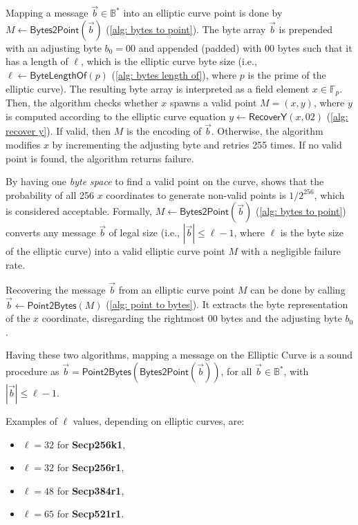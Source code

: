 Mapping a message $\vec{b} \in \mathbb{B}^*$ into an elliptic curve point is done by $M \gets \mathsf{Bytes2Point}(\vec{b})$ (\cref{alg: bytes to point}). The byte array $\vec{b}$ is prepended with an adjusting byte $b_0 = 00$ and appended (padded) with $00$ bytes such that it has a length of $\ell$, which is the elliptic curve byte size (i.e., $\ell \gets \mathsf{ByteLengthOf}(p)$ (\cref{alg: bytes length of}), where $p$ is the prime of the elliptic curve). The resulting byte array is interpreted as a field element $x \in \mathbb{F}_p$. Then, the algorithm checks whether $x$ spawns a valid point $M = (x, y)$, where $y$ is computed according to the elliptic curve equation $y \gets \mathsf{RecoverY}(x, 02)$ (\cref{alg: recover y}). If valid, then $M$ is the encoding of $\vec{b}$. Otherwise, the algorithm modifies $x$ by incrementing the adjusting byte and retries 255 times. If no valid point is found, the algorithm returns failure.

By having one \textit{byte space} to find a valid point on the curve, \cite{Trappe05} shows that the probability of all 256 $x$ coordinates to generate non-valid points is $1/2^{256}$, which is considered acceptable. Formally, $M \gets \mathsf{Bytes2Point}(\vec{b})$ (\cref{alg: bytes to point}) converts any message $\vec{b}$ of legal size (i.e., $|\vec{b}| \leq \ell - 1$, where $\ell$ is the byte size of the elliptic curve) into a valid elliptic curve point $M$ with a negligible failure rate.

Recovering the message $\vec{b}$ from an elliptic curve point $M$ can be done by calling $\vec{b} \gets \mathsf{Point2Bytes}(M)$ (\cref{alg: point to bytes}). It extracts the byte representation of the $x$ coordinate, disregarding the rightmost $00$ bytes and the adjusting byte $b_0$.

Having these two algorithms, mapping a message on the Elliptic Curve is a sound procedure as $\vec{b} = \mathsf{Point2Bytes}(\mathsf{Bytes2Point}(\vec{b}))$, for all $\vec{b} \in \mathbb{B}^*$, with $|\vec{b}| \leq \ell - 1$.

Examples of $\ell$ values, depending on elliptic curves, are:
\begin{multicols}{2}
\begin{itemize}
    \item $\ell = 32$ for \textbf{Secp256k1},
    \item $\ell = 32$ for \textbf{Secp256r1},
    \item $\ell = 48$ for \textbf{Secp384r1},
    \item $\ell = 65$ for \textbf{Secp521r1}.
\end{itemize}
\end{multicols}

